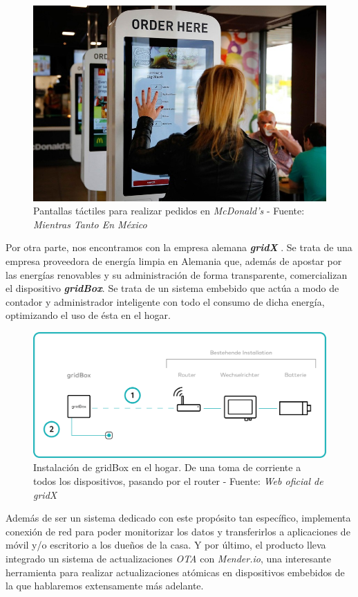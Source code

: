 \begin{figure}[H]
	\centering
	\includegraphics[width=0.75\linewidth]{imagenes/pedido-pantalla-tactil.jpg}
	\caption{Pantallas táctiles para realizar pedidos en \textit{McDonald's} - Fuente: \textit{Mientras Tanto En México} \cite{mcdonalds-pantalla-tactil-pedidos}}
\end{figure}

Por otra parte, nos encontramos con la empresa alemana \textbf{\textit{gridX}} \cite{gridx}. Se trata de una empresa proveedora de energía limpia en Alemania que, además de apostar por las energías renovables y su administración de forma transparente, comercializan el dispositivo \textbf{\textit{gridBox}}. Se trata de un sistema embebido que actúa a modo de contador y administrador inteligente con todo el consumo de dicha energía, optimizando el uso de ésta en el hogar.

\begin{figure}[H]
	\centering
	\includegraphics[width=0.75\linewidth]{imagenes/gridbox-utility.png}
	\caption{Instalación de gridBox en el hogar. De una toma de corriente a todos los dispositivos, pasando por el router - Fuente: \textit{Web oficial de gridX} \cite{gridbox}}
	\label{gridbox-installation}
\end{figure}

Además de ser un sistema dedicado con este propósito tan específico, implementa conexión de red para poder monitorizar los datos y transferirlos a aplicaciones de móvil y/o escritorio a los dueños de la casa. Y por último, el producto lleva integrado un sistema de actualizaciones \textit{OTA} con \textit{Mender.io}, una interesante herramienta para realizar actualizaciones atómicas en dispositivos embebidos de la que hablaremos extensamente más adelante.\\

